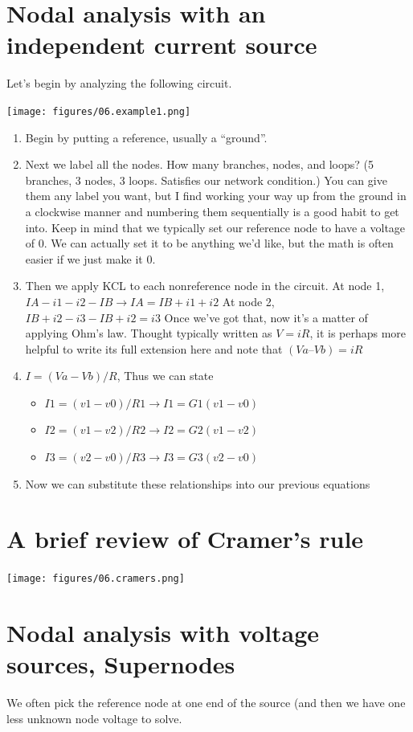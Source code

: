 \documentclass[11pt]{book}
\begin{document}
\section{Nodal analysis with an independent current source}
Let's begin by analyzing the following circuit.
\begin{center}
	\texttt{[image: figures/06.example1.png]}
\end{center}
\begin{enumerate}
	\item Begin by putting a reference, usually a ``ground''.
	\item Next we label all the nodes.
	\subitem How many branches, nodes, and loops? (5 branches, 3 nodes, 3 loops. Satisfies our network condition.)
	\subitem You can give them any label you want, but I find working your way up from the ground in a clockwise manner and numbering them sequentially is a good habit to get into.
	\subitem Keep in mind that we typically set our reference node to have a voltage of 0. We can actually set it to be anything we’d like, but the math is often easier if we just make it 0. 
	\item Then we apply KCL to each nonreference node in the circuit.
	\subitem At node 1, $IA - i1 - i2 - IB \rightarrow IA = IB + i1 + i2$
	\subitem At node 2, $IB + i2 - i3 - IB + i2 = i3$
	\subitem Once we’ve got that, now it’s a matter of applying Ohm’s law. Thought typically written as $V = iR$, it is perhaps more helpful to write its full extension here and note that $(Va – Vb) = iR$
	\item $I = (Va - Vb)/R$, Thus we can state
	\begin{itemize} 
		\item 	$I1 = (v1 - v0)/R1 	\rightarrow I1 = G1(v1 - v0)$
		\item $I2 = (v1 - v2)/R2	 \rightarrow I2 = G2(v1 - v2)$
		\item $I3 = (v2 - v0)/R3	 \rightarrow I3 = G3(v2 - v0)$
	\end{itemize}
	\item Now we can substitute these relationships into our previous equations
\end{enumerate}
\newpage

\section{A brief review of Cramer's rule}
\texttt{[image: figures/06.cramers.png]}
\newpage

\section{Nodal analysis with voltage sources, \textbf{Supernodes}}
We often pick the reference node at one end of the source (and then we have one less unknown node voltage to solve.
\end{document}
